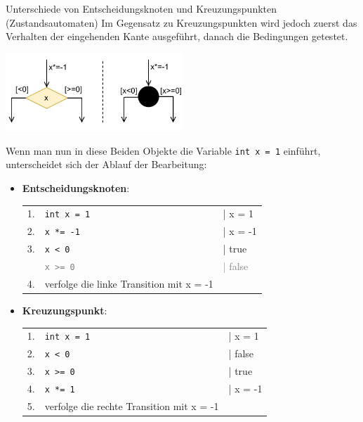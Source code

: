 \begin{bonus}{Unterschiede von Entscheidungsknoten und Kreuzungspunkten (Zustandsautomaten)}
    Im Gegensatz zu Kreuzungspunkten wird jedoch zuerst das Verhalten der eingehenden Kante ausgeführt, danach die Bedingungen getestet.

    \begin{center}
        \includegraphics[width=0.5\textwidth]{includes/figures/bonus_diagrams_state_if.pdf}
    \end{center}

    Wenn man nun in diese Beiden Objekte die Variable \texttt{int x = 1} einführt, unterscheidet sich der Ablauf der Bearbeitung:
    \begin{itemize}
        \item \textbf{Entscheidungsknoten}:

              \begin{tabular}{lll}
                  1. & \texttt{int x = 1}                       & | x = 1                   \\
                  2. & \texttt{x *= -1}                         & | x = -1                  \\
                  3. & \texttt{x < 0}                           & | true                    \\
                     & \textcolor{gray}{\texttt{x >= 0}}        & \textcolor{gray}{| false} \\
                  4. & verfolge die linke Transition mit x = -1 &
              \end{tabular}
        \item \textbf{Kreuzungspunkt}:

              \begin{tabular}{lll}
                  1. & \texttt{int x = 1}                        & | x = 1  \\
                  2. & \texttt{x < 0}                            & | false  \\
                  3. & \texttt{x >= 0}                           & | true   \\
                  4. & \texttt{x *= 1}                           & | x = -1 \\
                  5. & verfolge die rechte Transition mit x = -1 &
              \end{tabular}
    \end{itemize}
\end{bonus}


